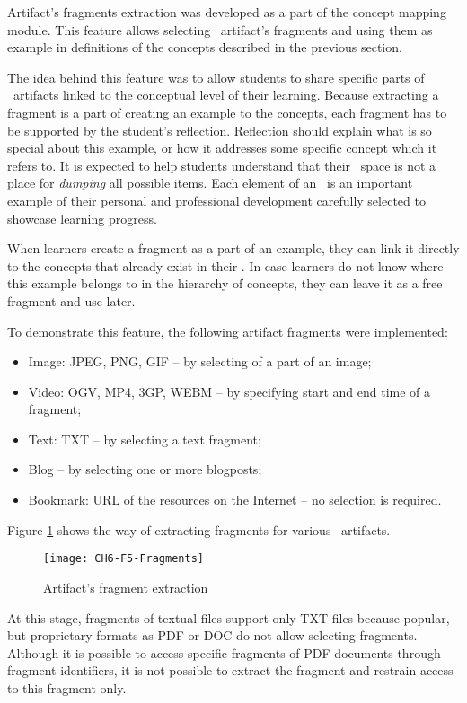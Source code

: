 Artifact's fragments extraction was developed as a part of the concept mapping
module. This feature allows selecting \ep~artifact's fragments and using
them as example in definitions of the concepts described in the previous
section.

The idea behind this feature was to allow students to share specific parts of
\ep~artifacts linked to the conceptual level of their learning. Because
extracting a fragment is a part of creating an example to the concepts, each
fragment has to be supported by the student's reflection. Reflection should
explain what is so special about this example, or how it addresses some specific
concept which it refers to. It is expected to help students understand that
their \ep~space is not a place for \textit{dumping} all possible items. Each
element of an \ep~is an important example of their personal and professional
development carefully selected to showcase learning progress.

When learners create a fragment as a part of an example, they can link it
directly to the concepts that already exist in their \ep. In case learners do
not know where this example belongs to in the hierarchy of concepts, they can
leave it as a free fragment and use later.

To demonstrate this feature, the following artifact fragments were implemented:

\begin{itemize}
  \item Image: JPEG, PNG, GIF -- by selecting of a part of an image;
  \item Video: OGV, MP4, 3GP, WEBM -- by specifying start and end time of a
  fragment;
  \item Text: TXT -- by selecting a text fragment;
  \item Blog -- by selecting one or more blogposts;
  \item Bookmark: URL of the resources on the Internet -- no selection is
  required.
\end{itemize} 

Figure \ref{fig:frag} shows the way of extracting fragments for various
\ep~artifacts.

\begin{figure}[h!]
\centering
\texttt{[image: CH6-F5-Fragments]}
\caption{Artifact's fragment extraction}
\label{fig:frag}
\end{figure}

\FloatBarrier

At this stage, fragments of textual files support only TXT files because
popular, but proprietary formats as PDF or DOC do not allow selecting fragments.
Although it is possible to access specific fragments of PDF documents through
fragment identifiers, it is not possible to extract the fragment and restrain
access to this fragment only.

